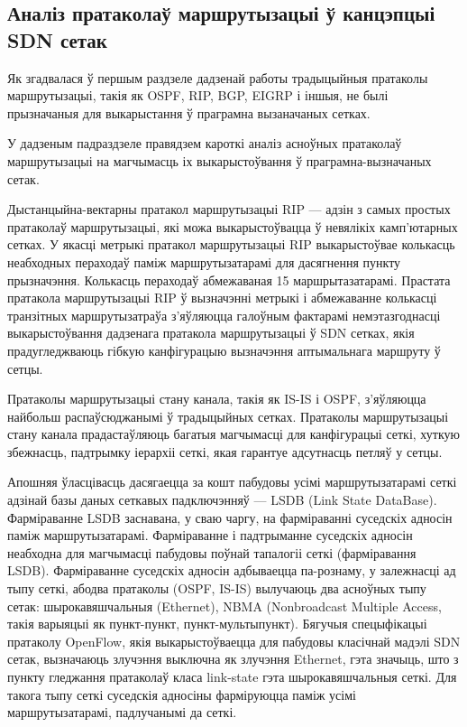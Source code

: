 \subsection{Аналіз пратаколаў маршрутызацыі ў канцэпцыі SDN сетак}

Як згадвалася ў першым раздзеле дадзенай работы традыцыйныя пратаколы
маршрутызацыі, такія як OSPF, RIP, BGP, EIGRP і іншыя, не былі прызначаныя
для выкарыстання ў праграмна вызаначаных сетках.

У дадзеным падраздзеле правядзем кароткі аналіз асноўных пратаколаў маршрутызацыі на магчымасць іх выкарыстоўвання  ў
праграмна-вызначаных сетак.

Дыстанцыйна-вектарны пратакол маршрутызацыі RIP --- адзін з самых простых пратаколаў маршрутызацыі, які можа выкарыстоўвацца ў невялікіх камп'ютарных сетках.
У якасці метрыкі пратакол маршрутызацыі RIP выкарыстоўвае колькасць неабходных пераходаў паміж маршрутызатарамі для дасягнення пункту
прызначэння. Колькасць пераходаў абмежаваная 15 маршрытазатарамі.
Прастата пратакола маршрутызацыі RIP ў вызначэнні метрыкі і абмежаванне
колькасці транзітных маршрутызатраўа
з'яўляюцца галоўным фактарамі немэтазгоднасці выкарыстоўвання дадзенага
пратакола маршрутызацыі ў SDN сетках, якія прадугледжваюць гібкую канфігурацыю вызначэння аптымальнага маршруту ў сетцы.

Пратаколы маршрутызацыі стану канала, такія як IS-IS і OSPF, з'яўляюцца
найбольш распаўсюджанымі ў традыцыйных сетках. Пратаколы маршрутызацыі
стану канала прадастаўляюць багатыя магчымасці для канфігурацыі сеткі,
хуткую збежнасць, падтрымку іерархіі сеткі, якая гарантуе адсутнасць
петляў у сетцы.

Апошняя ўласцівасць дасягаецца за кошт пабудовы усімі маршрутызатарамі сеткі адзінай базы даных сеткавых падключэнняў --- LSDB (Link State DataBase). Фарміраванне LSDB заснавана, у сваю чаргу, на фарміраванні суседскіх адносін паміж маршрутызатарамі. Фарміраванне і падтрыманне суседскіх адносін неабходна для магчымасці пабудовы поўнай тапалогіі сеткі (фарміравання LSDB). Фарміраванне суседскіх адносін адбываецца па-рознаму, у залежнасці ад тыпу сеткі, абодва пратаколы (OSPF, IS-IS) вылучаюць два асноўных тыпу сетак: шырокавяшчальныя (Ethernet), NBMA (Nonbroadcast
Multiple Access, такія варыяцыі як пункт-пункт, пункт-мультыпункт).
Бягучыя спецыфікацыі пратаколу OpenFlow, якія выкарыстоўваецца для пабудовы класічнай мадэлі SDN сетак, вызначаюць злучэння выключна як злучэння Ethernet, гэта значыць, што  з пункту гледжання пратаколаў класа link-state гэта шырокавяшчальныя сеткі. Для такога тыпу сеткі суседскія адносіны фарміруюцца паміж усімі маршрутызатарамі, падлучанымі да сеткі.

